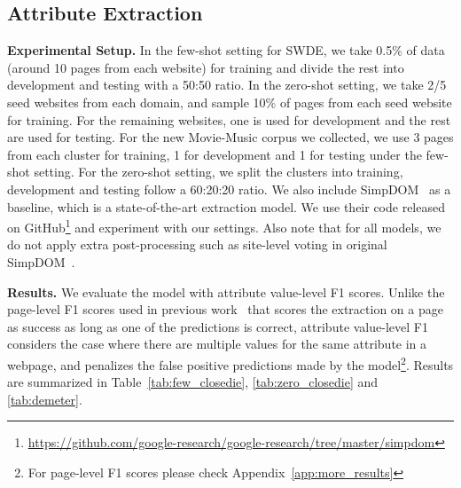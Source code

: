 \documentclass[sigconf, nonacm]{acmart}
\begin{document}
\subsection{Attribute Extraction}
\noindent\textbf{Experimental Setup.} In the few-shot setting for SWDE, we take 0.5\% of data (around 10 pages from each website) for training and divide the rest into development and testing with a 50:50 ratio. In the zero-shot setting, we take 2/5 seed websites from each domain, and sample 10\% of pages from each seed website for training. For the remaining websites, one is used for development and the rest are used for testing. For the new Movie-Music corpus we collected, we use 3 pages from each cluster for training, 1 for development and 1 for testing under the few-shot setting. For the zero-shot setting, we split the clusters into training, development and testing follow a 60:20:20 ratio. We also include SimpDOM~\cite{zhou2021simplified} as a baseline, which is a state-of-the-art extraction model. We use their code released on GitHub\footnote{\url{https://github.com/google-research/google-research/tree/master/simpdom}} and experiment with our settings. Also note that for all models, we do not apply extra post-processing such as site-level voting in original SimpDOM~\cite{zhou2021simplified}.

\vspace{0.1em}
\noindent\textbf{Results.} We evaluate the model with attribute value-level F1 scores. Unlike the page-level F1 scores used in previous work~\cite{zhou2021simplified, freedom} that scores the extraction on a page as success as long as one of the predictions is correct, attribute value-level F1 considers the case where there are multiple values for the same attribute in a webpage, and penalizes the false positive predictions made by the model\footnote{For page-level F1 scores please check Appendix~\ref{app:more_results}}. Results are summarized in Table~\ref{tab:few_closedie}, \ref{tab:zero_closedie} and \ref{tab:demeter}. 
\end{document}
